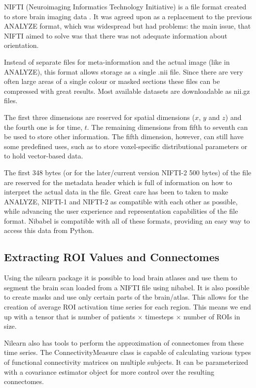 	NIFTI (Neuroimaging Informatics Technology Initiative) is a file format created to store brain imaging data \cite{nifti}. It was agreed upon as a replacement to the previous ANALYZE format, which was widespread but had problems: the main issue, that NIFTI aimed to solve was that there was not adequate information about orientation.
	
	Instead of separate files for meta-information and the actual image (like in ANALYZE), this format allows storage as a single .nii file. Since there are very often large areas of a single colour or masked sections these files can be compressed with great results. Most available datasets are downloadable as nii.gz files.
	
	The first three dimensions are reserved for spatial dimensions ($x$, $y$ and $z$) and the fourth one is for time, $t$. The remaining dimensions from fifth to seventh can be used to store other information. The fifth dimension, however, can still have some predefined uses, such as to store voxel-specific distributional parameters or to hold vector-based data. 
	
	The first 348 bytes (or for the later/current version NIFTI-2 500 bytes) of the file are reserved for the metadata header which is full of information on how to interpret the actual data in the file. Great care has been to taken to make ANALYZE, NIFTI-1 and NIFTI-2 as compatible with each other as possible, while advancing the user experience and representation capabilities of the file format. Nibabel is compatible with all of these formats, providing an easy way to access this data from Python.
	
	
	\subsection{Extracting ROI Values and Connectomes}
	\label{sec:extract}
	
	Using the nilearn package it is possible to load brain atlases and use them to segment the brain scan loaded from a NIFTI file using nibabel. It is also possible to create masks and use only certain parts of the brain/atlas. This allows for the creation of average ROI activation time series for each region. This means we end up with a tensor that is number of patients $\times$ timesteps $\times$ number of ROIs in size.
	
	Nilearn also has tools to perform the approximation of connectomes from these time series. The ConnectivityMeasure class is capable of calculating various types of functional connectivity matrices on multiple subjects. It can be parameterized with a covariance estimator object for more control over the resulting connectomes.
	